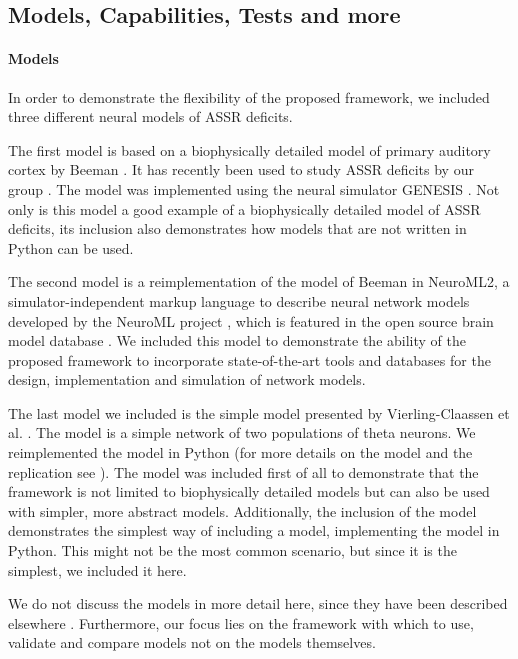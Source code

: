 \documentclass[CompPsych]{stjour}
\begin{document}
\subsection{Models, Capabilities, Tests and more}



\paragraph{Models}
In order to demonstrate the flexibility of the proposed framework, we included three different neural models of ASSR deficits.

The first model is based on a biophysically detailed model of primary auditory cortex by Beeman \cite{Beeman2013}. It has recently been used to study 
ASSR deficits by our group \cite{Metzner2016}. The model was implemented using the neural simulator GENESIS \cite{Bower1992,Bower1998}. Not only is this model
a good example of a biophysically detailed model of ASSR deficits, its inclusion also demonstrates how models that are not written in Python can be used.

The second model is a reimplementation of the model of Beeman in NeuroML2, a simulator-independent markup language to describe neural network models developed by the
NeuroML project \cite{Cannon2014}, which is featured in the open source brain model database \cite{Gleeson2012}. We included this model to demonstrate the ability of the proposed framework
to incorporate state-of-the-art tools and databases for the design, implementation and simulation of network models.

The last model we included is the simple model presented by Vierling-Claassen et al. \cite{Vierling2008}. The model is a simple network of two populations of theta neurons. 
We reimplemented the model in Python (for more details on the model and the replication see \cite{Metzner2017}).
The model
was included first of all to demonstrate that the framework is not limited to biophysically detailed models but can also be used with simpler, more abstract models.
Additionally, the inclusion of the model demonstrates the simplest way of including a model, implementing the model in Python. This might not be the most common scenario, but 
since it is the simplest, we included it here.

We do not discuss the models in more detail here, since they have been described elsewhere \cite{Beeman2013,Metzner2016,Vierling2008,Metzner2017}. Furthermore, our focus lies on the framework with which to use, validate and compare
models not on the models themselves.
\end{document}
